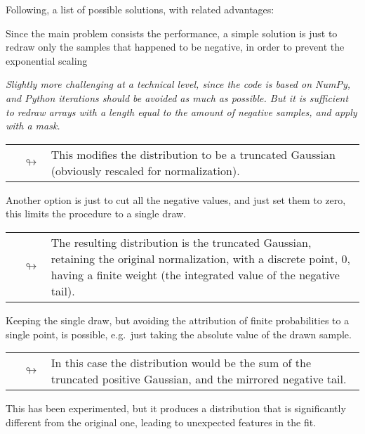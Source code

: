 Following, a list of possible solutions, with related advantages:
\begin{description}[font=\scshape,leftmargin=2cm,style=nextline]
  \item[decouple] Since the main problem consists the performance, a simple
    solution is just to redraw only the samples that happened to be negative,
    in order to prevent the exponential scaling

    {\small\itshape\noindent
      Slightly more challenging at a technical level, since the code is based
      on NumPy, and Python iterations should be avoided as much as possible.
      But it is sufficient to redraw arrays with a length equal to the amount
      of negative samples, and apply with a mask.
    }

    \begin{tabularx}{\linewidth}{cX}
      $\quad\looparrowright$ & This modifies the distribution to be a truncated
      Gaussian (obviously rescaled for normalization).
    \end{tabularx}

  \item[wall] Another option is just to cut all the negative values, and just
    set them to zero, this limits the procedure to a single draw.

    \begin{tabularx}{\linewidth}{cX}
      $\quad\looparrowright$ & The resulting distribution is the truncated
      Gaussian, retaining the original normalization, with a discrete point,
      $0$, having a finite weight (the integrated value of the negative tail).
    \end{tabularx}

  \item[reflection] Keeping the single draw, but avoiding the attribution of
    finite probabilities to a single point, is possible, e.g.\ just taking the
    absolute value of the drawn sample.

    \begin{tabularx}{\linewidth}{cX}
      $\quad\looparrowright$ & In this case the distribution would be the sum
      of the truncated positive Gaussian, and the mirrored negative tail.
    \end{tabularx}

    This has been experimented, but it produces a distribution that is
    significantly different from the original one, leading to unexpected
    features in the fit.


\end{description}
